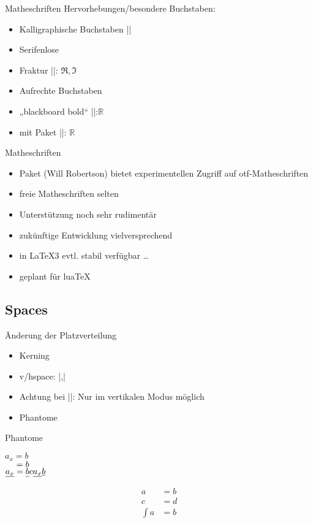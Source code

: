 \documentclass[
	vorläufig=false,
	datum=2016-11-18,
	titel={Mathematiksatz II},
	web=false,
]{../tex/latexkurs-slides}
\begin{document}
\begin{frame}[fragile]{Matheschriften}
Hervorhebungen/besondere Buchstaben:
\begin{itemize}
\item Kalligraphische Buchstaben |\mathcal|
\item Serifenlose
\item Fraktur |\Re \Im|: \hfill $\Re, \Im$
\item Aufrechte Buchstaben
\item „blackboard bold“ ||:\hfill $\mathbb R$
\item mit Paket  ||: \hfill$\mathds{R}$
\end{itemize} 
\end{frame}

\begin{frame}[fragile]{Matheschriften}
\begin{itemize}
\item Paket  (Will Robertson) bietet experimentellen Zugriff auf otf-Matheschriften
\item freie Matheschriften selten
\item Unterstützung noch sehr rudimentär
\item zukünftige Entwicklung vielversprechend
\item in \LaTeX3 evtl. stabil verfügbar \dots
\item geplant für lua\TeX
\end{itemize}
\end{frame}


\subsection{Spaces}
\begin{frame}[fragile]{Änderung der Platzverteilung}
\begin{itemize}
\item Kerning
\item v/hspace: |\hspace{1cm},\hspace*{1cm}|
\item Achtung bei |\vspace|: Nur im vertikalen Modus möglich
\item Phantome
\end{itemize}
\end{frame}

\begin{frame}[fragile]{Phantome}
\begin{LTXexample}[width=.4\textwidth]
$a_x = b$\\
$\hphantom{a_x} = b$\\
$\underline{a_x} = \underline{b\vphantom{a_x}} c \underline{a_x} \underline b$
\end{LTXexample}
\begin{LTXexample}
\begin{align*}
a &= b\\
c &= d\\
\int a &= b
\end{align*}
\end{LTXexample}
\end{frame}
\end{document}
